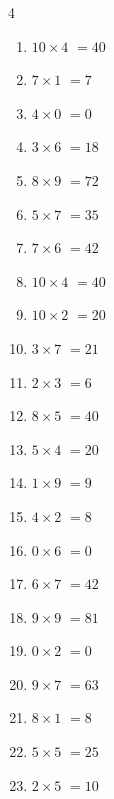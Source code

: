 \begin{multicols}{4}
\begin{enumerate}
  \item $10\times 4$
        $=40$

  \item $7\times 1$
        $=7$

  \item $4\times 0$
        $=0$

  \item $3\times 6$
        $=18$

  \item $8\times 9$
        $=72$

  \item $5\times 7$
        $=35$

  \item $7\times 6$
        $=42$

  \item $10\times 4$
        $=40$

  \item $10\times 2$
        $=20$

  \item $3\times 7$
        $=21$

  \item $2\times 3$
        $=6$

  \item $8\times 5$
        $=40$

\columnbreak %

  \item $5\times 4$
        $=20$

  \item $1\times 9$
        $=9$

  \item $4\times 2$
        $=8$

  \item $0\times 6$
        $=0$

  \item $6\times 7$
        $=42$

  \item $9\times 9$
        $=81$

  \item $0\times 2$
        $=0$

  \item $9\times 7$
        $=63$

  \item $8\times 1$
        $=8$

  \item $5\times 5$
        $=25$

  \item $2\times 5$
        $=10$


\end{enumerate}
\end{multicols}
